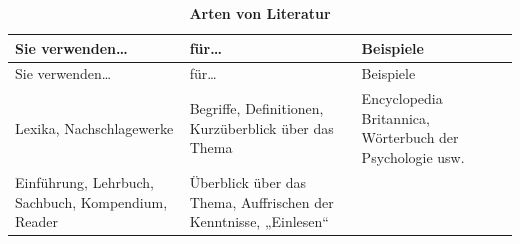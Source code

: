 \documentclass[]{book}
\theoremstyle{definition}
\theoremstyle{definition}
\theoremstyle{definition}
\theoremstyle{remark}
\begin{document}
\begin{longtable}[]{@{}lll@{}}
\caption{\textbf{\label{tab:literaturarten} Arten von
Literatur}}\tabularnewline
\toprule
\begin{minipage}[b]{0.31\columnwidth}\raggedright\strut
Sie verwenden\ldots{}\strut
\end{minipage} & \begin{minipage}[b]{0.27\columnwidth}\raggedright\strut
für\ldots{}\strut
\end{minipage} & \begin{minipage}[b]{0.33\columnwidth}\raggedright\strut
Beispiele\strut
\end{minipage}\tabularnewline
\midrule
\endfirsthead
\toprule
\begin{minipage}[b]{0.31\columnwidth}\raggedright\strut
Sie verwenden\ldots{}\strut
\end{minipage} & \begin{minipage}[b]{0.27\columnwidth}\raggedright\strut
für\ldots{}\strut
\end{minipage} & \begin{minipage}[b]{0.33\columnwidth}\raggedright\strut
Beispiele\strut
\end{minipage}\tabularnewline
\midrule
\endhead
\begin{minipage}[t]{0.31\columnwidth}\raggedright\strut
Lexika, Nachschlagewerke\vspace{5mm}\strut
\end{minipage} & \begin{minipage}[t]{0.27\columnwidth}\raggedright\strut
Begriffe, Definitionen, Kurzüberblick über das Thema\vspace{5mm}\strut
\end{minipage} & \begin{minipage}[t]{0.33\columnwidth}\raggedright\strut
Encyclopedia Britannica, Wörterbuch der Psychologie usw.
\vspace{5mm}\strut
\end{minipage}\tabularnewline
\begin{minipage}[t]{0.31\columnwidth}\raggedright\strut
Einführung, Lehrbuch, Sachbuch, Kompendium, Reader\vspace{5mm}\strut
\end{minipage} & \begin{minipage}[t]{0.27\columnwidth}\raggedright\strut
Überblick über das Thema, Auffrischen der Kenntnisse,
„Einlesen``\vspace{5mm}\strut
\end{minipage} & \begin{minipage}[t]{0.33\columnwidth}\raggedright\strut

\end{minipage}
\end{longtable}
\end{document}
